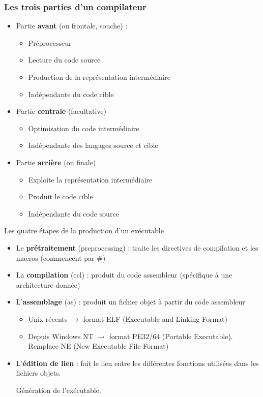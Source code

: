 \begin{frame}
\frametitle{Les trois parties d'un compilateur \cite{wp-compilateur}}
\begin{itemize}
\item <1-> Partie \textbf{avant} (ou frontale, souche) :
\begin{itemize}
\item Préprocesseur
\item Lecture du code source
\item Production de la représentation intermédiaire
\item Indépendante du code cible
\end{itemize}

\item <2-> Partie \textbf{centrale} (facultative)
\begin{itemize}
\item Optimisation du code intermédiaire
\item Indépendante des langages source et cible
\end{itemize}

\item <3-> Partie \textbf{arrière} (ou finale)
\begin{itemize}
\item Exploite la représentation intermédiaire
\item Produit le code cible
\item Indépendante du code source
\end{itemize}
\end{itemize}
\end{frame}


\begin{frame}{Les quatre étapes de la production d'un exécutable}
\begin{itemize}
\item <1-> [Etape 1] Le \textbf{prétraitement} (preprocessing) : traite les directives de compilation et les macros (commencent par \#)
\item <2-> [Etape 2] La \textbf{compilation} (ccl) : produit du code assembleur (spécifique à une architecture donnée)
\item <3-> [Etape 3] L'\textbf{assemblage} (as) : produit un fichier objet à partir du code assembleur
	\begin{itemize}
	\item Unix récents $\rightarrow$ format ELF (Executable and Linking Format)
	\item Depuis Windows NT $\rightarrow$ format PE32/64 (Portable Executable). Remplace NE (New Executable File Format)
	\end{itemize}
\item <4> [Etape 4] L'\textbf{édition de lien} : fait le lien entre les différentes fonctions utilisées dans les fichiers objets.

Génération de l'exécutable.
\end{itemize}
\end{frame}

